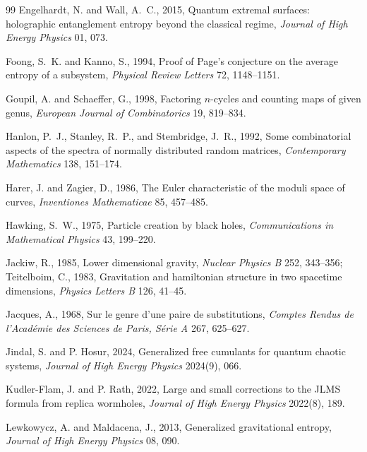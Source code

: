 \documentclass[11pt,letterpaper]{article}
\theoremstyle{plain}
\theoremstyle{definition}
\theoremstyle{remark}
\begin{document}
\begin{thebibliography}{99}
Engelhardt, N. and Wall, A.~C., 2015, Quantum extremal surfaces: holographic entanglement entropy beyond the classical regime, \textit{Journal of High Energy Physics} 01, 073.

Foong, S.~K. and Kanno, S., 1994, Proof of Page's conjecture on the average entropy of a subsystem, \textit{Physical Review Letters} 72, 1148--1151.

Goupil, A. and Schaeffer, G., 1998, Factoring $n$-cycles and counting maps of given genus, \textit{European Journal of Combinatorics} 19, 819--834.

Hanlon, P.~J., Stanley, R.~P., and Stembridge, J.~R., 1992, Some combinatorial aspects of the spectra of normally distributed random matrices, \textit{Contemporary Mathematics} 138, 151--174.

Harer, J. and Zagier, D., 1986, The Euler characteristic of the moduli space of curves, \textit{Inventiones Mathematicae} 85, 457--485.


Hawking, S.~W., 1975, Particle creation by black holes, \textit{Communications in Mathematical Physics} 43, 199--220.

Jackiw, R., 1985, Lower dimensional gravity, \textit{Nuclear Physics B} 252, 343--356; Teitelboim, C., 1983, Gravitation and hamiltonian structure in two spacetime dimensions, \textit{Physics Letters B} 126, 41--45.


Jacques, A., 1968, Sur le genre d'une paire de substitutions, \textit{Comptes Rendus de l'Acad\'emie des Sciences de Paris, S\'erie A} 267, 625--627.

Jindal, S. and P. Hosur, 2024, Generalized free cumulants for quantum chaotic systems, \textit{Journal of High Energy Physics} 2024(9), 066.

Kudler-Flam, J. and P. Rath, 2022, Large and small corrections to the JLMS formula from replica wormholes, \textit{Journal of High Energy Physics} 2022(8), 189.

Lewkowycz, A. and Maldacena, J., 2013, Generalized gravitational entropy, \textit{Journal of High Energy Physics} 08, 090.


\end{thebibliography}
\end{document}
